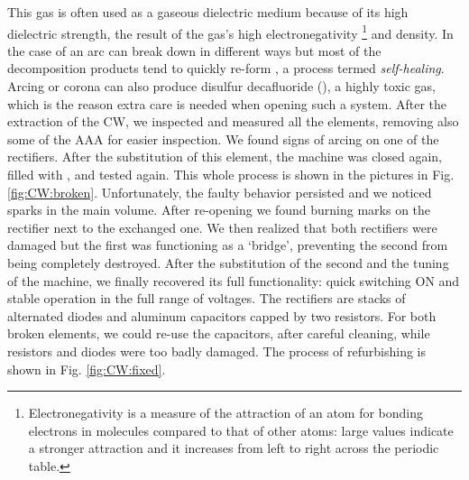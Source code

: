\begin{refsection}
    This gas is often used as a gaseous dielectric medium because of its high dielectric strength, the result of the gas's high electronegativity
    \footnote{Electronegativity is a measure of the attraction of an atom for bonding electrons in molecules compared to that of other atoms: large values indicate a stronger attraction and it increases from left to right across the periodic table.} and density.
    In the case of an arc  can break down in different ways but most of the decomposition products tend to quickly re-form , a process termed \textit{self-healing}. 
    Arcing or corona can also produce disulfur decafluoride (), a highly toxic gas, which is the reason extra care is needed when opening such a system.
    After the extraction of the CW, we inspected and measured all the elements, removing also some of the AAA for easier inspection. 
    We found signs of arcing on one of the rectifiers. 
    After the substitution of this element, the machine was closed again, filled with , and tested again.
    This whole process is shown in the pictures in Fig. \ref{fig:CW:broken}.
    Unfortunately, the faulty behavior persisted and we noticed sparks in the main volume. 
    After re-opening we found burning marks on the rectifier next to the exchanged one.
    We then realized that both rectifiers were damaged but the first was functioning as a `bridge', preventing the second from being completely destroyed. 
    After the substitution of the second and the tuning of the machine, we finally recovered its full functionality: quick switching ON and stable operation in the full range of voltages.
    The rectifiers are stacks of alternated diodes and aluminum capacitors capped by two resistors. For both broken elements, we could re-use the capacitors, after careful cleaning, while resistors and diodes were too badly damaged. The process of refurbishing is shown in Fig. \ref{fig:CW:fixed}.


\end{refsection}
